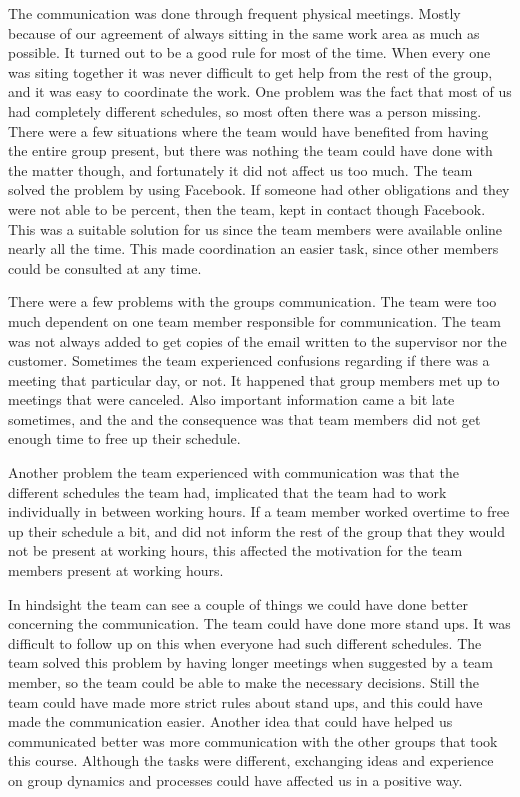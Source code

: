 The communication was done through frequent physical meetings. Mostly because of our
agreement of always sitting in the same work area as much as possible. It turned out to be a good rule for most of the time. When every one was siting together it was never difficult to get help from the rest of the group, and it was easy to coordinate the work. One problem was the fact that most of us had completely different schedules, so most often there was a person missing. There were a few situations where the team would have benefited from having the entire group present, but there was nothing the team could have done with the matter though, and fortunately it did not affect us too much. The team solved the problem by using Facebook. If someone had other obligations and they were not able to be percent, then the team, kept in contact though Facebook. This was a suitable solution for us since the team members were available online nearly all the time. This made coordination an easier task, since other members could be consulted at any time. 

There were a few problems with the groups communication. The team were too much dependent on one team member responsible for communication. The team was not always added to get copies of the email written to the supervisor nor the customer. Sometimes the team experienced confusions regarding if there was a meeting that particular day, or not. It happened that group members met up to meetings that were canceled. Also important information came a bit late sometimes, and the and the consequence was that team members did not get enough time to free up their schedule.

Another problem the team experienced with communication was that the different schedules the team had, implicated that the team had to work individually in between working hours. If a team member worked overtime to free up their schedule a bit, and did not inform the rest of the group that they would not be present at working hours, this affected the motivation for the team members present at working hours. 


In hindsight the team can see a couple of things we could have done better concerning the communication. The team could have done more stand ups. It was difficult to follow up on this when everyone had such different schedules. The team solved this problem by having longer meetings when suggested by a team member, so the team could be able to make the necessary decisions. Still the team could have made more strict rules about stand ups, and this could have made the communication easier.
Another idea that could have helped us communicated better was more communication with the other
groups that took this course. Although the tasks were different, exchanging ideas and experience on group dynamics and processes could have affected us in a positive way. 

